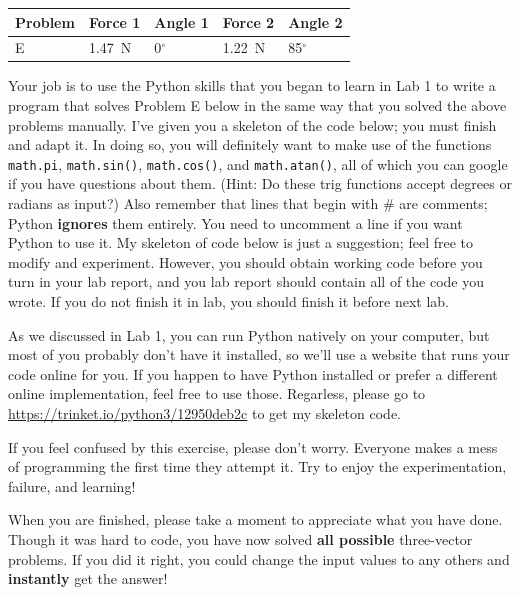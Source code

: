 \documentclass[11pt]{article}
\begin{document}
\begin{center}
\begin{tabular}{l|ll|ll}
\hline
Problem & Force 1 & Angle 1 & Force 2 & Angle 2 \\
\hline
E & 1.47~N  & 0$^\circ$ & 1.22~N & 85$^\circ$ \\
\hline
\end{tabular}
\end{center}

Your job is to use the Python skills that you began to learn in Lab 1 to write a program that solves Problem E below in the same way that you solved the above problems manually. I've given you a skeleton of the code below; you must finish and adapt it. In doing so, you will definitely want to make use of the functions \texttt{math.pi}, \texttt{math.sin()}, \texttt{math.cos()}, and \texttt{math.atan()}, all of which you can google if you have questions about them. (Hint: Do these trig functions accept degrees or radians as input?) Also remember that lines that begin with \# are comments; Python \textbf{ignores} them entirely. You need to uncomment a line if you want Python to use it. My skeleton of code below is just a suggestion; feel free to modify and experiment. However, you should obtain working code before you turn in your lab report, and you lab report should contain all of the code you wrote. If you do not finish it in lab, you should finish it before next lab. 

As we discussed in Lab 1, you can run Python natively on your computer, but most of you probably don't have it installed, so we'll use a website that runs your code online for you. If you happen to have Python installed or prefer a different online implementation, feel free to use those. Regarless, please go to \url{https://trinket.io/python3/12950deb2c} to get my skeleton code.  

If you feel confused by this exercise, please don't worry. Everyone makes a mess of programming the first time they attempt it. Try to enjoy the experimentation, failure, and learning!

When you are finished, please take a moment to appreciate what you have done. Though it was hard to code, you have now solved \textbf{all possible} three-vector problems. If you did it right, you could change the input values to any others and \textbf{instantly} get the answer! 
\end{document}
